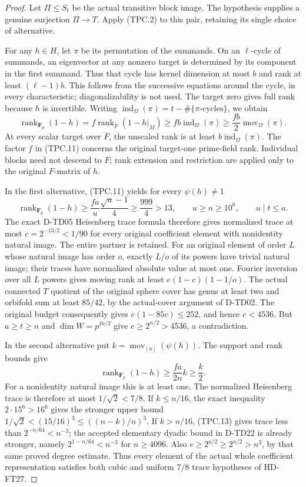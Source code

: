 \begin{proof}
Let $\Pi\le S_t$ be the actual transitive block image.
The hypothesis supplies a genuine surjection $\Pi\to T$.
Apply (TPC.2) to this pair, retaining its single choice of alternative.

For any $h\in H$, let $\pi$ be its permutation of the summands.
On an $\ell$-cycle of summands, an eigenvector at any nonzero
target is determined by its component in the first summand.
Thus that cycle has kernel dimension at most $b$ and rank at
least $(\ell-1)b$.  This follows from the successive equations
around the cycle, in every characteristic; diagonalizability is
not used.  The target zero gives full rank because $h$ is invertible.
Writing $\operatorname{ind}_\Omega(\pi)=t-\#\{\pi\text{-cycles}\}$,
we obtain
\[
 \operatorname{rank}_{\mathbf F_p}(1-h)
  =f\operatorname{rank}_{\overline F}(1-h|_M)
  \ge fb\operatorname{ind}_{\Omega}(\pi)
  \ge\frac{fb}{2}\operatorname{mov}_{\Omega}(\pi).
 \tag{TPC.11}
\]
At every scalar target over $\overline F$, the unscaled rank is
at least $b\operatorname{ind}_{\Omega}(\pi)$.  The factor $f$
in (TPC.11) concerns the original target-one prime-field rank.
Individual blocks need not descend to $F$;
rank extension and restriction are applied only to the original
$F$-matrix of $h$.

In the first alternative, (TPC.11) yields for every $\psi(h)\ne1$
\[
 \operatorname{rank}_{\mathbf F_p}(1-h)
       \ge\frac{fa}{u}\frac{\sqrt u-1}{4}
       \ge\frac{999}{4}>13,
 \qquad u\ge n\ge10^6,\qquad u\mid t\le a.
 \tag{TPC.12}
\]
The exact D-TD05 Heisenberg trace formula therefore gives normalized
trace at most $c=2^{-13/2}<1/90$ for every original coefficient
element with nonidentity natural image.  The entire partner is
retained.  For an original element of order $L$ whose natural
image has order $o$, exactly $L/o$ of its powers have trivial
natural image; their traces have normalized absolute value at
most one.  Fourier inversion over all $L$ powers gives moving
rank at least $e(1-c)(1-1/o)$.
The actual connected $T$ quotient of the original sphere cover
has genus at least two and orbifold sum at least $85/42$, by the
actual-cover argument of D-TD02.  The original budget consequently
gives $e(1-85c)\le252$, and hence $e<4536$.
But $a\ge t\ge n$ and $\dim W=p^{fa/2}$ give
$e\ge2^{n/2}>4536$, a contradiction.

In the second alternative put $k=\operatorname{mov}_{[n]}(\psi(h))$.
The support and rank bounds give
\[
 \operatorname{rank}_{\mathbf F_p}(1-h)
                         \ge\frac{fa}{2n}k\ge\frac{k}{2}.
 \tag{TPC.13}
\]
For a nonidentity natural image this is at least one.  The normalized
Heisenberg trace is therefore at most $1/\sqrt2<7/8$.
If $k\le n/16$, the exact inequality
$2\cdot15^6>16^6$ gives the stronger upper bound
$1/\sqrt2<(15/16)^3\le((n-k)/n)^3$.
If $k>n/16$, (TPC.13) gives trace less than
$2^{-n/64}<n^{-3}$; the accepted elementary dyadic bound in
D-TD22 is already stronger, namely $2^{1-n/64}<n^{-3}$ for
$n\ge4096$.  Also $e\ge2^{a/2}\ge2^{n/2}>n^3$, by that same
proved degree estimate.  Thus every element of the actual whole
coefficient representation satisfies both cubic and uniform
$7/8$ trace hypotheses of HD-FT27.


\end{proof}
